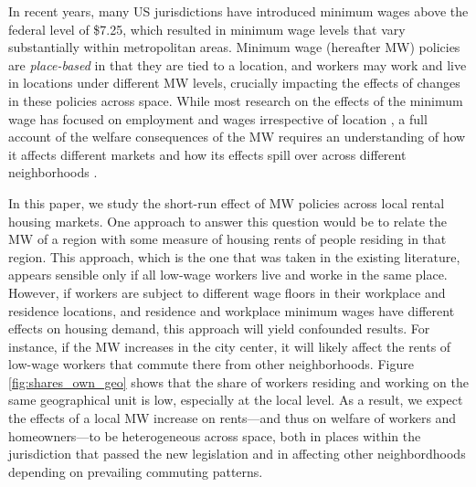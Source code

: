 

In recent years, many US jurisdictions have introduced minimum wages above the 
federal level of \$7.25, which resulted in minimum wage levels that vary 
substantially within metropolitan areas. 
Minimum wage (hereafter MW) policies are \textit{place-based} in that they are 
tied to a location, and workers may work and live in locations under different 
MW levels, crucially impacting the effects of changes in these policies across 
space.
While most research on the effects of the minimum wage has focused on employment 
and wages irrespective of location 
\parencite[e.g.,][]{CardKrueger1994, AutorEtAl2016, CegnizEtAl2019}, 
a full account of the welfare consequences of the MW requires an understanding of 
how it affects different markets and how its effects spill over across different 
neighborhoods \parencite[as recently emphasized by][]{DubeLindner2021}.

In this paper, we study the short-run effect of MW policies across local rental 
housing markets.
One approach to answer this question would be to relate the MW of a region with 
some measure of housing rents of people residing in that region.
This approach, which is the one that was taken in the existing literature, appears 
sensible only if all low-wage workers live and worke in the same place.
However, if workers are subject to different wage floors in their workplace and
residence locations, and residence and workplace minimum wages have different 
effects on housing demand, this approach will yield confounded results.
For instance, if the MW increases in the city center, it will likely affect the 
rents of low-wage workers that commute there from other neighborhoods.
Figure \ref{fig:shares_own_geo} shows that the share of workers residing and 
working on the same geographical unit is low, especially at the local level.
As a result, we expect the effects of a local MW increase on rents---and thus on 
welfare of workers and homeowners---to be heterogeneous across space, both in 
places within the jurisdiction that passed the new legislation and in affecting
other neighbordhoods depending on prevailing commuting patterns.

